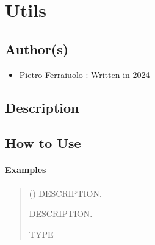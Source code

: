 \documentclass[letterpaper,10pt,english]{sphinxmanual}
\begin{document}
\sphinxstepscope


\chapter{Utils}
\label{\detokenize{utils:module-ggcas.utils}}\label{\detokenize{utils:utils}}\label{\detokenize{utils::doc}}

\section{Author(s)}
\label{\detokenize{utils:author-s}}\begin{itemize}
\item {} 
\sphinxAtStartPar
Pietro Ferraiuolo : Written in 2024

\end{itemize}


\section{Description}
\label{\detokenize{utils:description}}

\section{How to Use}
\label{\detokenize{utils:how-to-use}}\subsubsection*{Examples}

\begin{fulllineitems}
\label{\detokenize{utils:ggcas.utils.dataList}}
\pysigstartsignatures
{}
\pysigstopsignatures\begin{quote}\begin{description}
\sphinxAtStartPar
{} () \textendash{} DESCRIPTION.

\sphinxAtStartPar
{} \textendash{} DESCRIPTION.

\sphinxAtStartPar
TYPE

\end{description}\end{quote}

\end{fulllineitems}
\end{document}
